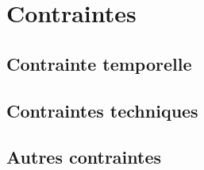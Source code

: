 \documentclass[a4paper]{article}
\begin{document}
		

\section{Contraintes}

	\subsection{Contrainte temporelle}

		

	\subsection{Contraintes techniques}

		

	\subsection{Autres contraintes}

		
\newpage

\begin{appendices} 
	
\end{appendices} 
\end{document}
